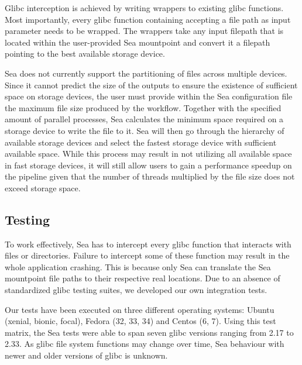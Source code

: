 \documentclass[10pt,journal,compsoc]{IEEEtran}
\newcommand{\todo}[1]{\marginpar{\parbox{18mm}{\flushleft\tiny\color{red}\textbf{TODO}:
#1}}}
\begin{document}
Glibc interception is achieved by writing wrappers to existing glibc functions.
Most importantly, every glibc function containing accepting a file path as input parameter needs to be
wrapped. The wrappers take any input filepath that is located within the
user-provided Sea mountpoint and convert it a filepath pointing to the best
available storage device.

Sea does not currently support the partitioning of files across multiple
devices. Since it cannot predict the size of the outputs to ensure the existence
of sufficient space on storage devices, the user must provide within the Sea
configuration file the maximum file size produced by the workflow. Together with
the specified amount of parallel processes, Sea calculates the minimum space
required on a storage device to write the file to it.
Sea will then go through the hierarchy of available storage devices and select
the fastest storage device with sufficient available space. While this process
may result in not utilizing all available space in fast storage devices, it will
still allow users to gain a performance speedup on the pipeline given that the
number of threads multiplied by the file size does not exceed storage space.

\subsection{Testing}
To work effectively, Sea has to intercept every glibc function that interacts
with files or directories. Failure to intercept some of these function may
result in the whole application crashing. This is because only Sea can translate
the Sea mountpoint file paths to their respective real locations. Due to an
absence of standardized glibc testing suites, we developed our own integration
tests.

Our tests have been executed on three different operating systems: Ubuntu
(xenial, bionic, focal), Fedora (32, 33, 34) and Centos (6, 7). Using this test
matrix, the Sea tests were able to span seven glibc versions ranging from 2.17
to 2.33. As glibc file system functions may change over time, Sea behaviour with
newer and older versions of glibc is unknown. 
\end{document}
